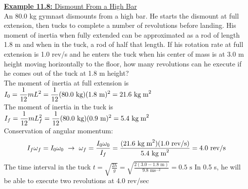 \documentclass[a4paper]{article}
\let\bf\textbf
\newcommand\s{\text{ s}}
\newcommand\m{\text{ m}}
\newcommand\mss{\text{ ms}^{-2}}
\newcommand\kg{\text{ kg}}
\newcommand\kgmm{\text{ kg\;m}^{2}}
\begin{document}
\begin{shaded}
    \underline{\bf{Example 11.8:} Dismount From a High Bar}
    \vspace{2mm}\\
    An 80.0 kg gymnast dismounts from a high bar. He starts the dismount at full extension, then tucks to complete a number of revolutions before landing. His moment of inertia when fully extended can be approximated as a rod of length 1.8 m and when in the tuck, a rod of half that length. If his rotation rate at full extension is 1.0 rev/s and he enters the tuck when his center of mass is at 3.0 m height moving horizontally to the floor, how many revolutions can he execute if he comes out of the tuck at 1.8 m height?
    \vspace{1mm}\\
    The moment of inertia at full extension is $\displaystyle I_0 = \frac{1}{12}mL^2 = \frac{1}{12}(80.0\kg)(1.8\m)^2 = 21.6\kgmm$\\
    The moment of inertia in the tuck is $\displaystyle I_f = \frac{1}{12}mL_f^2 = \frac{1}{12}(80.0\kg)(0.9\m)^2 = 5.4\kgmm$\\
    Conservation of angular momentum:
    \begin{align*}
        I_f\omega_f = I_0\omega_0\ \to\ \omega_f = \frac{I_0\omega_0}{I_f} = \frac{(21.6\kgmm)(1.0\text{ rev/s})}{5.4\kgmm} = 4.0\text{ rev/s}
    \end{align*}
    The time interval in the tuck $\displaystyle t = \sqrt{\frac{2h}{g}} = \sqrt{\frac{2(3.0 - 1.8\m)}{9.8\mss}} = 0.5\s$
    In 0.5 s, he will be able to execute two revolutions at 4.0 rev/sec
\end{shaded}
\end{document}
